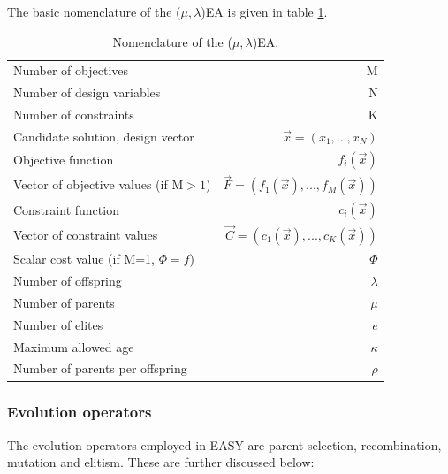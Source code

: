 The basic nomenclature of the ($\mu,\lambda$)EA is given in table \ref{GEA nomenclature}. 

\begin{table}[htdp]
\centering
\begin{tabular}{lr} 
\hline
\hline
Number of objectives & M\\
Number of design variables & N\\
Number of constraints   & K\\
\hline
Candidate solution, design vector   & $\vec{x}=(x_1,...,x_N)$\\
Objective function &$f_i(\vec{x})$ \\
Vector of objective values (if M$>\!1$)  &$\vec{F}=(f_1(\vec{x}),...,f_M(\vec{x}))$\\
Constraint function &$c_i(\vec{x})$ \\
Vector of constraint values  & $\vec{C}=(c_1(\vec{x}),...,c_K(\vec{x}))$\\
Scalar cost value (if M=1, $\Phi\!=\!f$) & $\Phi$ \\
\hline
Number of offspring &   $\lambda$ 			\\
Number of parents &  $\mu$ 				\\
Number of elites &  $e$			\\
Maximum allowed age &  $\kappa$			\\
Number of parents per offspring &  $\rho$			\\
\hline
\hline
\end{tabular}
\caption[GEA nomenclature]{Nomenclature of the ($\mu,\lambda$)EA.}
\label{GEA nomenclature} 
\end{table}


\subsubsection{Evolution operators}
\label{evOps}
The evolution operators employed in EASY are parent selection,  recombination, mutation and  elitism. These are further discussed below: 
   
